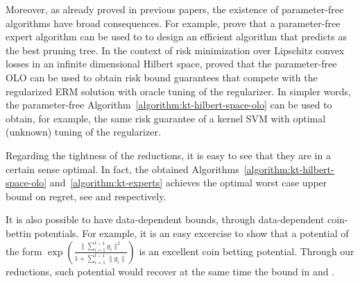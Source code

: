 Moreover, as already proved in previous papers, the existence of parameter-free
algorithms have broad consequences. For example, \citet{LuoS15} prove that a
parameter-free expert algorithm can be used to to design an efficient algorithm
that predicts as the best pruning tree. In the context of risk minimization over
Lipschitz convex losses in an infinite dimensional Hilbert space,
\citet{Orabona14} proved that the parameter-free \ac{OLO} can be used to obtain
risk bound guarantees that compete with the regularized \ac{ERM} solution with
oracle tuning of the regularizer. In simpler words, the parameter-free
Algorithm~\ref{algorithm:kt-hilbert-space-olo} can be used to obtain, for
example, the same risk guarantee of a kernel \ac{SVM} with optimal (unknown)
tuning of the regularizer.

Regarding the tightness of the reductions, it is easy to see that they are in a
certain sense optimal. In fact, the obtained
Algorithms~\ref{algorithm:kt-hilbert-space-olo} and~\ref{algorithm:kt-experts}
achieves the optimal worst case upper bound on regret, see \citet{Orabona13} and
\citet{Cesa-BianchiL06} respectively.

It is also possible to have data-dependent bounds, through data-dependent
coin-bettin potentials. For example, it is an easy excercise to show that a
potential of the form $\exp \left(\frac{\|\sum_{i=1}^{t-1}
g_{i}\|^2}{1+\sum_{i=1}^{t-1} \|g_{i}\|}\right)$ is an excellent coin
betting potential. Through our reductions, such potential would recover at the
same time the bound in \citet{LuoS15} and \citet{Orabona14}.
